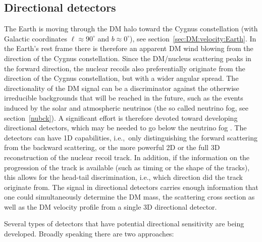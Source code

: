 \subsection{Directional detectors}
\label{sec:dir:detection}
The Earth is moving through the DM halo toward  the Cygnus constellation (with Galactic coordinates $\ell \approx 90^\circ$ and $b\approx 0^\circ$), see section~\ref{sec:DM:velocity:Earth}. In the Earth's rest frame there is therefore an apparent DM wind blowing  
from the direction of the Cygnus constellation. Since the DM/nucleus scattering peaks in the forward direction, the nuclear recoils also preferentially originate from the direction of the Cygnus constellation, but with a wider angular spread. 
The directionality of the DM signal can be a discriminator against the otherwise irreducible backgrounds that will be reached in the future, 
such as the events induced by the solar and atmospheric neutrinos (the so called neutrino fog, see section~\ref{nubck}). 
A significant effort is therefore devoted toward developing directional detectors, which may be needed to go below the neutrino fog \cite{1110.6079}. The detectors can have 1D capabilities, i.e.,~only distinguishing the forward scattering from the backward scattering, or the more powerful 2D or the full 3D reconstruction of the nuclear recoil track. In addition, if the information on the progression of the track is available (such as timing or the shape of the tracks), this allows for the head-tail discrimination, i.e., which direction did the track originate from. The signal in directional detectors carries enough information 
that one could simultaneously determine the DM mass, the scattering cross section as well as the DM velocity profile from a single 3D directional detector.

Several types of detectors that have potential directional sensitivity are being developed. Broadly speaking there are two approaches:

